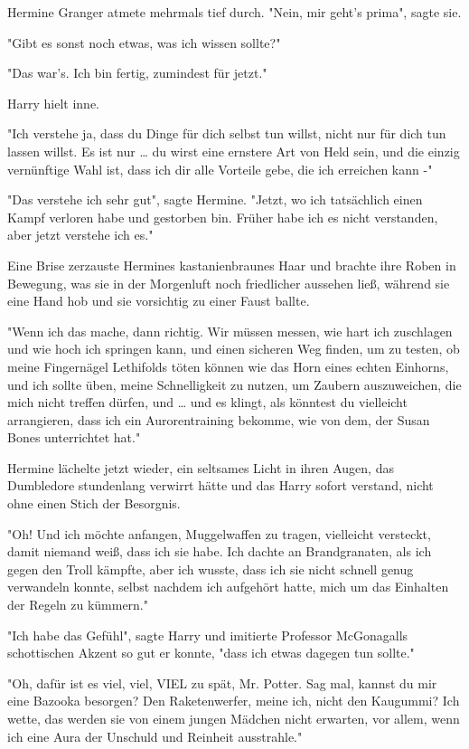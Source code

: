 {Hermine Granger atmete mehrmals tief durch. "Nein, mir geht's prima", sagte sie.

"Gibt es sonst noch etwas, was ich wissen sollte?"

"Das war's. Ich bin fertig, zumindest für jetzt."

Harry hielt inne.

"Ich verstehe ja, dass du Dinge für dich selbst tun willst, nicht nur für dich tun lassen willst. Es ist nur … du wirst eine ernstere Art von Held sein, und die einzig vernünftige Wahl ist, dass ich dir alle Vorteile gebe, die ich erreichen kann -"

"Das verstehe ich sehr gut", sagte Hermine. "Jetzt, wo ich tatsächlich einen Kampf verloren habe und gestorben bin. Früher habe ich es nicht verstanden, aber jetzt verstehe ich es."

Eine Brise zerzauste Hermines kastanienbraunes Haar und brachte ihre Roben in Bewegung, was sie in der Morgenluft noch friedlicher aussehen ließ, während sie eine Hand hob und sie vorsichtig zu einer Faust ballte.

"Wenn ich das mache, dann richtig. Wir müssen messen, wie hart ich zuschlagen und wie hoch ich springen kann, und einen sicheren Weg finden, um zu testen, ob meine Fingernägel Lethifolds töten können wie das Horn eines echten Einhorns, und ich sollte üben, meine Schnelligkeit zu nutzen, um Zaubern auszuweichen, die mich nicht treffen dürfen, und … und es klingt, als könntest du vielleicht arrangieren, dass ich ein Aurorentraining bekomme, wie von dem, der Susan Bones unterrichtet hat."

Hermine lächelte jetzt wieder, ein seltsames Licht in ihren Augen, das Dumbledore stundenlang verwirrt hätte und das Harry sofort verstand, nicht ohne einen Stich der Besorgnis.

"Oh! Und ich möchte anfangen, Muggelwaffen zu tragen, vielleicht versteckt, damit niemand weiß, dass ich sie habe. Ich dachte an Brandgranaten, als ich gegen den Troll kämpfte, aber ich wusste, dass ich sie nicht schnell genug verwandeln konnte, selbst nachdem ich aufgehört hatte, mich um das Einhalten der Regeln zu kümmern."

"Ich habe das Gefühl", sagte Harry und imitierte Professor McGonagalls schottischen Akzent so gut er konnte, "dass ich etwas dagegen tun sollte."

"Oh, dafür ist es viel, viel, VIEL zu spät, Mr. Potter. Sag mal, kannst du mir eine Bazooka besorgen? Den Raketenwerfer, meine ich, nicht den Kaugummi? Ich wette, das werden sie von einem jungen Mädchen nicht erwarten, vor allem, wenn ich eine Aura der Unschuld und Reinheit ausstrahle."

}
